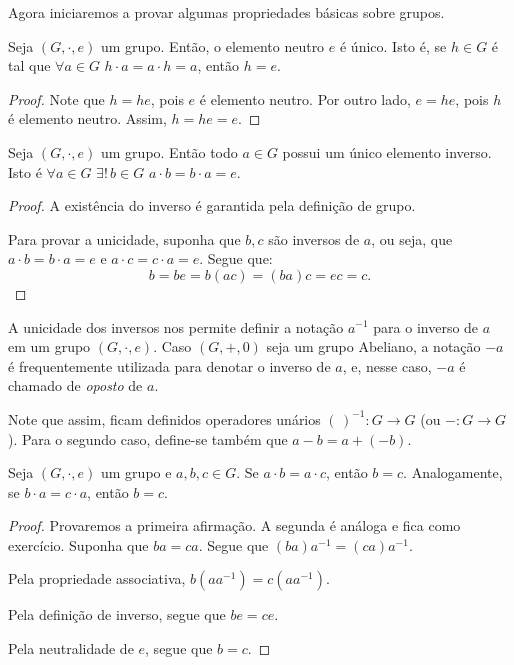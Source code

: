 Agora iniciaremos a provar algumas propriedades básicas sobre grupos.
\begin{prop}\label{prop:group_uniqueNeutral}
    Seja $(G,\cdot,e)$ um grupo.
    Então, o elemento neutro $e$ é único.
    Isto é, se $h \in G$ é tal que $\forall a \in G$ $h \cdot a = a \cdot h = a$, então $h = e$.
\end{prop}
\begin{proof}
    Note que $h=he$, pois $e$ é elemento neutro.
    Por outro lado, $e=he$, pois $h$ é elemento neutro.
    Assim, $h=he=e$.
\end{proof}

\begin{prop}\label{prop:group_uniqueInverse}
    Seja $(G,\cdot,e)$ um grupo.
    Então todo $a \in G$ possui um único elemento inverso.
Isto é $\forall a \in G$ $\exists!\, b \in G$ $a \cdot b = b \cdot a = e$.
\end{prop}
\begin{proof}
    A existência do inverso é garantida pela definição de grupo.
    
    Para provar a unicidade, suponha que $b, c$ são inversos de $a$, ou seja, que $a \cdot b = b \cdot a = e$ e $a \cdot c = c \cdot a = e$.
    Segue que:
    $$b=be=b(ac)=(ba)c=ec=c.$$
\end{proof}

A unicidade dos inversos nos permite definir a notação $a^{-1}$ para o inverso de $a$ em um grupo $(G,\cdot,e)$.
Caso $(G, +, 0)$ seja um grupo Abeliano, a notação $-a$ é frequentemente utilizada para denotar o inverso de $a$, e, nesse caso, $-a$ é chamado de \emph{oposto} de $a$.

Note que assim, ficam definidos operadores unários $(\,)^{-1}:G\rightarrow G$ (ou $-:G\rightarrow G$).
Para o segundo caso, define-se também que $a-b=a+(-b)$.

\begin{prop}[Cancelamento]\label{prop:group_cancel}
    Seja $(G,\cdot,e)$ um grupo e $a,b,c \in G$.
    Se $a \cdot b = a \cdot c$, então $b=c$.
    Analogamente, se $b \cdot a = c \cdot a$, então $b=c$.
\end{prop}
\begin{proof}
    Provaremos a primeira afirmação.
    A segunda é análoga e fica como exercício.
    Suponha que $ba=ca$.
    Segue que $(ba)a^{-1}=(ca)a^{-1}$.
    
    Pela propriedade associativa, $b(aa^{-1})=c(aa^{-1})$.

    Pela definição de inverso, segue que $be=ce$.

    Pela neutralidade de $e$, segue que $b=c$.
\end{proof}

